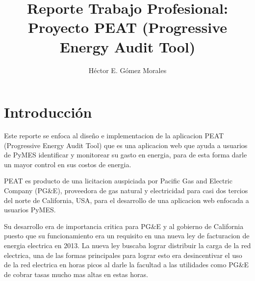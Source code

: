 \documentclass{article}
\author{Héctor E. Gómez Morales}
\title{Reporte Trabajo Profesional: Proyecto PEAT (Progressive Energy
  Audit Tool)}
\begin{document}
\maketitle
\tableofcontents
\section{Introducción}
Este reporte se enfoca al diseño e implementacion de la aplicacion
PEAT (Progressive Energy Audit Tool) que es una aplicacion web que
ayuda a usuarios de PyMES identificar y monitorear su gasto en
energia, para de esta forma darle un mayor control en sus costos de
energia.

PEAT es producto de una licitacion auspiciada por Pacific Gas and
Electric Company (PG\&E), proveedora de gas natural y electricidad
para casi dos tercios del norte de California, USA, para
el desarrollo de una aplicacion web enfocada a usuarios PyMES.

Su desarrollo era de importancia critica para PG\&E y al gobierno de
California puesto que su funcionamiento era un requisito en una nueva
ley de facturacion de energia electrica en 2013. La nueva ley buscaba
lograr distribuir la carga de la red electrica, una de las formas
principales para lograr esto era desincentivar el uso de la red
electrica en horas picos al darle la facultad a las utilidades como PG\&E
de cobrar tasas mucho mas altas en estas horas.
\end{document}
